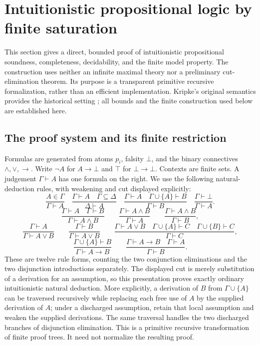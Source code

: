 \section{Intuitionistic propositional logic by finite saturation}
\label{sec:ipc-saturation}
\providecommand{\IPC}{\mathsf{IPC}}
\providecommand{\ipra}{\mathsf{iPRA}}
\providecommand{\Forces}{\Vdash}

This section gives a direct, bounded proof of intuitionistic propositional
soundness, completeness, decidability, and the finite model property.
The construction uses neither an infinite maximal theory nor a preliminary
cut-elimination theorem. Its purpose is a transparent primitive recursive
formalization, rather than an efficient implementation. Kripke's original
semantics provides the historical setting \cite{kripke1965}; all bounds and
the finite construction used below are established here.

\subsection{The proof system and its finite restriction}

Formulas are generated from atoms $p_i$, falsity $\bot$, and the binary
connectives $\wedge,\vee,\to$. Write $\neg A$ for $A\to\bot$ and $\top$ for
$\bot\to\bot$. Contexts are finite sets. A judgement $\Gamma\vdash A$ has
one formula on the right. We use the following natural-deduction rules, with
weakening and cut displayed explicitly:
\[
\frac{A\in\Gamma}{\Gamma\vdash A}\quad
\frac{\Gamma\vdash A\quad\Gamma\subseteq\Delta}{\Delta\vdash A}\quad
\frac{\Gamma\vdash A\quad\Gamma\cup\{A\}\vdash B}{\Gamma\vdash B}\quad
\frac{\Gamma\vdash\bot}{\Gamma\vdash A}.
\]
\[
\frac{\Gamma\vdash A\quad\Gamma\vdash B}{\Gamma\vdash A\wedge B}
\qquad
\frac{\Gamma\vdash A\wedge B}{\Gamma\vdash A}
\qquad
\frac{\Gamma\vdash A\wedge B}{\Gamma\vdash B},
\]
\[
\frac{\Gamma\vdash A}{\Gamma\vdash A\vee B}\qquad
\frac{\Gamma\vdash B}{\Gamma\vdash A\vee B}\qquad
\frac{\Gamma\vdash A\vee B\quad
       \Gamma\cup\{A\}\vdash C\quad
       \Gamma\cup\{B\}\vdash C}{\Gamma\vdash C},
\]
\[
\frac{\Gamma\cup\{A\}\vdash B}{\Gamma\vdash A\to B}
\qquad
\frac{\Gamma\vdash A\to B\quad\Gamma\vdash A}{\Gamma\vdash B}.
\]
These are twelve rule forms, counting the two conjunction eliminations and
the two disjunction introductions separately. The displayed cut is merely
substitution of a derivation for an assumption, so this presentation proves
exactly ordinary intuitionistic natural deduction. More explicitly, a
derivation of $B$ from $\Gamma\cup\{A\}$ can be traversed recursively while
replacing each free use of $A$ by the supplied derivation of $A$; under a
discharged assumption, retain that local assumption and weaken the supplied
derivations. The same traversal handles the two discharged branches of
disjunction elimination. This is a primitive recursive transformation of
finite proof trees. It need not normalize the resulting proof.

